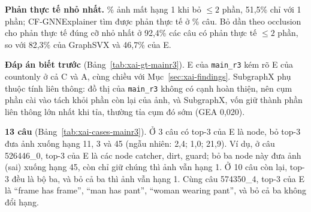 \textbf{Phản thực tế nhỏ nhất.} \% ảnh mất hạng 1 khi bỏ $\le 2$ phần, 51,5\% chỉ với 1 phần;
CF-GNNExplainer tìm được phản thực tế ở \% câu. Bỏ dần theo occlusion cho phản thực tế đúng cỡ nhỏ nhất ở
92,4\% các câu có phản thực tế $\le 2$ phần, so với 82,3\% của GraphSVX và 46,7\% của E.

\textbf{Đáp án biết trước} (Bảng~\ref{tab:xai-gt-mainr3}). E của \texttt{main\_r3} kém rõ E của countonly ở cả C và A, cùng
chiều với Mục~\ref{sec:xai-findings}. SubgraphX phụ thuộc tính liên thông: đồ thị của \texttt{main\_r3} không có cạnh hoàn
thiện, nên cụm phần cài vào tách khỏi phần còn lại của ảnh, và SubgraphX, vốn giữ thành phần liên thông lớn nhất khi tỉa,
thường tỉa cụm đó sớm (GEA 0,020).

\textbf{13 câu} (Bảng~\ref{tab:xai-cases-mainr3}). Ở 3 câu có top-3 của E là node, bỏ top-3 đưa ảnh xuống hạng 11, 3 và 45 (ngẫu nhiên: 2,4; 1,0; 21,9).
Ví dụ, ở câu 526446\_0, top-3 của E là các node catcher, dirt, guard; bỏ ba node này đưa ảnh (sai) xuống hạng 45, còn chỉ giữ
chúng thì ảnh vẫn hạng 1. Ở 10 câu còn lại, top-3 đều là bộ ba, và bỏ cả ba thì ảnh vẫn hạng 1. Cùng câu 574350\_4, top-3 của
E là ``frame has frame'', ``man has pant'', ``woman wearing pant'', và bỏ cả ba không đổi hạng.

